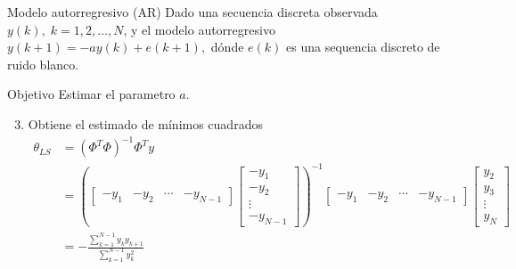 \documentclass[presentation,aspectratio=169]{beamer}
\begin{document}
\begin{frame}[label={sec:orgda50524}]{Modelo autorregresivo (AR)}
Dado una secuencia discreta observada \(y(k), \; k=1,2,\ldots,N\), y el modelo autorregresivo
\(y(k+1) = -ay(k) + e(k+1),\)
dónde \(e(k)\) es una sequencia discreto de ruido blanco.

\alert{Objetivo} Estimar el parametro \(a\).

\begin{enumerate}
\setcounter{enumi}{2}
\item Obtiene el estimado de mínimos cuadrados 
\begin{align*}
 \theta_{LS} &= (\Phi^T\Phi)^{-1}\Phi^T y\\ &= \left(\begin{bmatrix} -y_1 & -y_2 & \cdots & -y_{N-1}\end{bmatrix}\begin{bmatrix}-y_1\\-y_2\\\vdots\\-y_{N-1}\end{bmatrix}\right)^{-1}\begin{bmatrix} -y_1 & -y_2 & \cdots & -y_{N-1}\end{bmatrix}\begin{bmatrix}y_2\\y_3\\\vdots\\y_N\end{bmatrix}\\
 &= -\frac{\sum_{k=1}^{N-1} y_ky_{k+1}}{\sum_{k=1}^{N-1}y_k^2}
 \end{align*}
\end{enumerate}
\end{frame}
\end{document}

